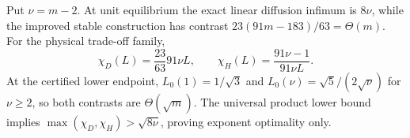 Put $\nu=m-2$.  At unit equilibrium the exact linear diffusion infimum is
$8\nu$, while the improved stable construction has contrast
$23(91m-183)/63=\Theta(m)$.  For the physical trade-off family,
\[
 \chi_D(L)=\frac{23}{63}91\nu L,
 \qquad
 \chi_H(L)=\frac{91\nu-1}{91\nu L}.
\]
At the certified lower endpoint, $L_0(1)=1/\sqrt3$ and
$L_0(\nu)=\sqrt5/(2\sqrt\nu)$ for $\nu\ge2$, so both contrasts are
$\Theta(\sqrt m)$.  The universal product lower bound implies
$\max(\chi_D,\chi_H)>\sqrt{8\nu}$, proving exponent optimality only.
